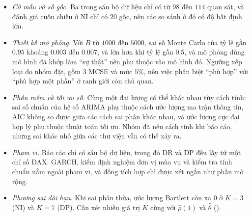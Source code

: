 \begin{itemize}[leftmargin=*,itemsep=2pt]
\item \emph{Cỡ mẫu và số gốc.} Ba trong sáu bộ dữ liệu chỉ có từ $98$ đến $114$ quan sát, và đánh giá cuốn chiếu ở NI chỉ có $20$ gốc, nên các so sánh ở đó có độ bất định lớn.
\item \emph{Thiết kế mô phỏng.} Với $B$ từ $1000$ đến $5000$, sai số Monte Carlo của tỷ lệ gần $0.95$ khoảng $0.003$ đến $0.007$, và lớn hơn khi tỷ lệ gần $0.5$, và mô phỏng dùng mô hình đã khớp làm ``sự thật'' nên phụ thuộc vào mô hình đó. Ngưỡng xếp loại do nhóm đặt, gồm $3$ MCSE và mức $5\%$, nên việc phân biệt ``phù hợp'' với ``phù hợp một phần'' ở ranh giới còn chủ quan.
\item \emph{Phần mềm và tối ưu số.} Cùng một đại lượng có thể khác nhau tùy cách tính: sai số chuẩn của hệ số ARIMA phụ thuộc cách ước lượng ma trận thông tin, AIC không so được giữa các cách sai phân khác nhau, và ước lượng cực đại hợp lý phụ thuộc thuật toán tối ưu. Nhóm đã nêu cách tính khi báo cáo, nhưng sai khác nhỏ giữa các thư viện vẫn có thể xảy ra.
\item \emph{Phạm vi.} Báo cáo chỉ có sáu bộ dữ liệu, trong đó DR và DP đều lấy từ một chỉ số DAX. GARCH, kiểm định nghiệm đơn vị mùa vụ và kiểm tra tính chuẩn nằm ngoài phạm vi, và đồng tích hợp chỉ được xét ngắn như phần mở rộng.
\item \emph{Phương sai dài hạn.} Khi sai phân thừa, ước lượng Bartlett còn xa $0$ ở $K=3$ (NI) và $K=7$ (DP). Cần xét nhiều giá trị $K$ cùng với $\hat\rho(1)$ và $\hat\theta$ ().
\end{itemize}

